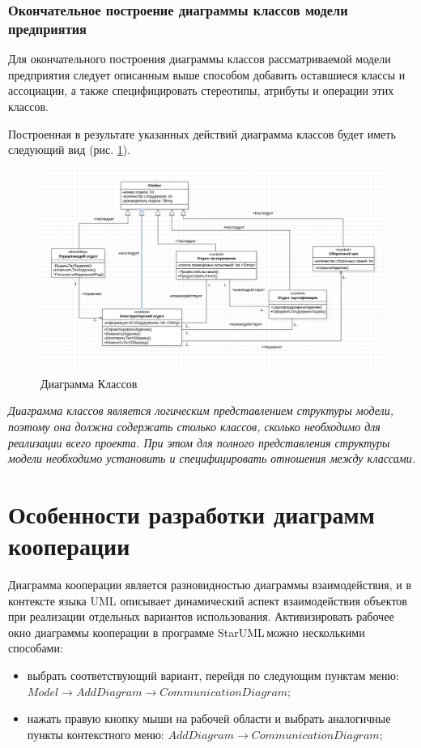\documentclass[a4paper,12pt]{extreport}
\newcommand{\staruml}{StarUML\,\tm}
\begin{document}
\subsubsection*{Окончательное построение диаграммы классов модели предприятия}
Для окончательного построения диаграммы классов рассматриваемой модели предприятия следует описанным выше способом добавить оставшиеся классы и ассоциации, а также специфицировать стереотипы, атрибуты и операции этих классов. 

Построенная в результате указанных действий диаграмма классов будет иметь следующий вид (рис. \ref{fig:classdiagram}).

\begin{figure}[h!]
	\centering
	\includegraphics[width=0.9\linewidth]{images/classdiagram}
	\caption{Диаграмма Классов}
	\label{fig:classdiagram}
\end{figure}


\textit{Диаграмма классов является логическим представлением структуры модели, поэтому она должна содержать столько классов, сколько необходимо для реализации всего проекта. При этом для полного представления структуры модели необходимо установить и специфицировать отношения между классами.} 


\section{Особенности разработки диаграмм кооперации}
Диаграмма кооперации является разновидностью диаграммы взаимодействия, и в контексте языка UML описывает динамический аспект взаимодействия объектов при реализации отдельных вариантов использования. Активизировать рабочее окно диаграммы кооперации в программе \staruml можно несколькими способами:
\begin{itemize}
	\item выбрать соответствующий вариант, перейдя по следующим пунктам меню: \\$Model \to Add Diagram \to Communication Diagram$;
	\item нажать правую кнопку мыши на рабочей области и выбрать аналогичные пункты контекстного меню: $Add Diagram \to Communication Diagram$;
\end{itemize}
\end{document}

